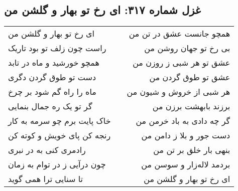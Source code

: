 \begin{center}
\section*{غزل شماره ۳۱۷: ای رخ تو بهار و گلشن من}
\label{sec:317}
\begin{longtable}{l p{0.5cm} r}
ای رخ تو بهار و گلشن من
&&
همچو جانست عشق در تن من
\\
راست چون زلف تو بود تاریک
&&
بی رخ تو جهان روشن من
\\
همچو خورشید و ماه در تابد
&&
عشق تو هر شبی ز روزن من
\\
دست تو طوق گردن دگری
&&
عشق تو طوق گردن من
\\
ماه را راه گم شود بر چرخ
&&
هر شبی از خروش و شیون من
\\
گر تو یک ره جمال بنمایی
&&
برزند بابهشت برزن من
\\
خاک پایت برم چو سرمه به کار
&&
گر چه دادی به باد خرمن من
\\
رنجه کن پای خویش و کوته کن
&&
دست جور و بلا ز دامن من
\\
رادمری کنی به در نبری
&&
بنهی بار خلق بر تن من
\\
چون درآیی ز در توام به زمان
&&
بردمد لاله‌زار و سوسن من
\\
تا سنایی ترا همی گوید
&&
ای رخ تو بهار و گلشن من
\\
\end{longtable}
\end{center}

